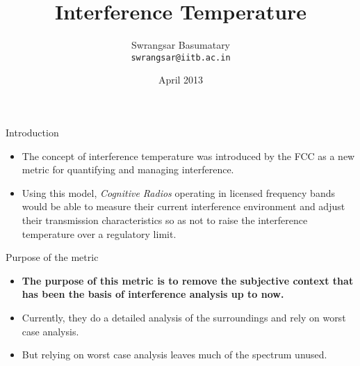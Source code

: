 \documentclass[mathserif]{beamer}
\title{Interference Temperature }
\author{Swrangsar Basumatary \\
\texttt{swrangsar@iitb.ac.in}}
\institute{Indian Institute of Technology Bombay}
\date{April 2013}
\begin{document}
    \frame{\titlepage}

\begin{frame}{Introduction}

\begin{itemize}
	\pause
	\item The concept of interference temperature was introduced by the FCC as a new metric for quantifying and managing interference.
	\pause
	\item Using this model, \emph{Cognitive Radios} operating in licensed frequency bands would be able to measure their current interference environment and adjust their transmission characteristics so as not to raise the interference temperature over a regulatory limit.
\end{itemize}

%

\end{frame}

\begin{frame}{Purpose of the metric}

\begin{itemize}
	\pause 
	\item \textbf{The purpose of this metric is to remove the subjective context that has been the basis of interference analysis up to now.}
	\pause
	\item Currently, they do a  detailed analysis of the surroundings and rely on worst case analysis.
	
	
	\item But relying on worst case analysis leaves much of the spectrum unused. 
\end{itemize}

\end{frame}
\end{document}
